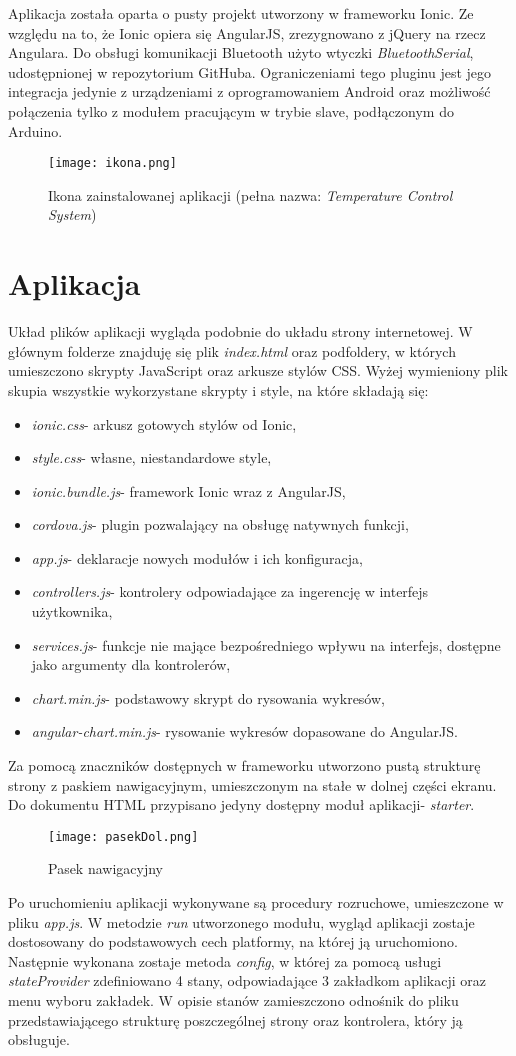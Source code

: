 Aplikacja została oparta o pusty projekt utworzony w frameworku Ionic. Ze względu na to, że Ionic opiera się AngularJS, zrezygnowano z jQuery na rzecz Angulara. Do obsługi komunikacji Bluetooth użyto wtyczki \textit{BluetoothSerial}, udostępnionej w repozytorium GitHuba. Ograniczeniami tego pluginu jest jego integracja jedynie z urządzeniami z oprogramowaniem Android oraz możliwość połączenia tylko z modułem pracującym w trybie slave, podłączonym do Arduino.
\begin{figure}[H]
	\centering
	\texttt{[image: ikona.png]}
	\caption{Ikona zainstalowanej aplikacji (pełna nazwa: \textit{Temperature Control System})}
\end{figure}
\section{Aplikacja}%
Układ plików aplikacji wygląda podobnie do układu strony internetowej. W głównym folderze znajduję się plik \textit{index.html} oraz podfoldery, w których umieszczono skrypty JavaScript oraz arkusze stylów CSS. Wyżej wymieniony plik skupia wszystkie wykorzystane skrypty i style, na które składają się:
\begin{itemize}
\item \textit{ionic.css}- arkusz gotowych stylów od Ionic,
\item \textit{style.css}- własne, niestandardowe style,
\item \textit{ionic.bundle.js}- framework Ionic wraz z AngularJS,
\item \textit{cordova.js}- plugin pozwalający na obsługę natywnych funkcji,
\item \textit{app.js}- deklaracje nowych modułów i ich konfiguracja,
\item \textit{controllers.js}- kontrolery odpowiadające za ingerencję w interfejs użytkownika,
\item \textit{services.js}- funkcje nie mające bezpośredniego wpływu na interfejs, dostępne jako argumenty dla kontrolerów,
\item \textit{chart.min.js}- podstawowy skrypt do rysowania wykresów,
\item \textit{angular-chart.min.js}- rysowanie wykresów dopasowane do AngularJS.
\end{itemize}
Za pomocą znaczników dostępnych w frameworku utworzono pustą strukturę strony z paskiem nawigacyjnym, umieszczonym na stałe w dolnej części ekranu. Do dokumentu HTML przypisano jedyny dostępny moduł aplikacji- \textit{starter}.
\begin{figure}[H]
	\centering
	\texttt{[image: pasekDol.png]}
	\caption{Pasek nawigacyjny}
\end{figure}
Po uruchomieniu aplikacji wykonywane są procedury rozruchowe, umieszczone w pliku \textit{app.js}. W metodzie \textit{run} utworzonego modułu, wygląd aplikacji zostaje dostosowany do podstawowych cech platformy, na której ją uruchomiono. Następnie wykonana zostaje metoda \textit{config}, w której za pomocą usługi \textit{stateProvider} zdefiniowano 4 stany, odpowiadające 3 zakładkom aplikacji oraz menu wyboru zakładek. W opisie stanów zamieszczono odnośnik do pliku przedstawiającego strukturę poszczególnej strony oraz kontrolera, który ją obsługuje.
